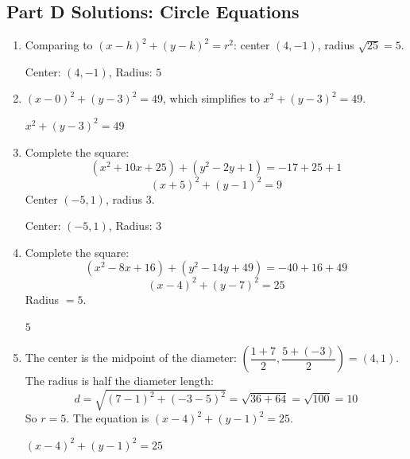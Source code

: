 \documentclass[14pt]{extarticle}
\begin{document}
\subsection*{Part D Solutions: Circle Equations}
\begin{enumerate}
  \item Comparing to \((x - h)^2 + (y - k)^2 = r^2\): center \((4, -1)\), radius \(\sqrt{25} = 5\).

  Center: \(\boxed{(4, -1)}\), Radius: \(\boxed{5}\)

  \item \((x - 0)^2 + (y - 3)^2 = 49\), which simplifies to \(x^2 + (y - 3)^2 = 49\).

  \(\boxed{x^2 + (y - 3)^2 = 49}\)

  \item Complete the square:
  \[
  (x^2 + 10x + 25) + (y^2 - 2y + 1) = -17 + 25 + 1
  \]
  \[
  (x + 5)^2 + (y - 1)^2 = 9
  \]
  Center \((-5, 1)\), radius \(3\).

  Center: \(\boxed{(-5, 1)}\), Radius: \(\boxed{3}\)

  \item Complete the square:
  \[
  (x^2 - 8x + 16) + (y^2 - 14y + 49) = -40 + 16 + 49
  \]
  \[
  (x - 4)^2 + (y - 7)^2 = 25
  \]
  Radius \(= 5\).

  \(\boxed{5}\)

  \item The center is the midpoint of the diameter: \(\left(\dfrac{1+7}{2}, \dfrac{5+(-3)}{2}\right) = (4, 1)\). The radius is half the diameter length:
  \[
  d = \sqrt{(7-1)^2 + (-3-5)^2} = \sqrt{36 + 64} = \sqrt{100} = 10
  \]
  So \(r = 5\). The equation is \((x - 4)^2 + (y - 1)^2 = 25\).

  \(\boxed{(x - 4)^2 + (y - 1)^2 = 25}\)
\end{enumerate}
\end{document}
